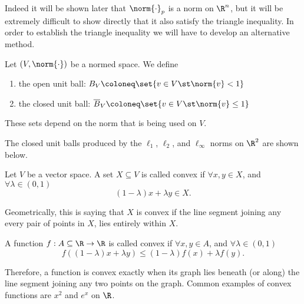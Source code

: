 \begin{remark}
  Indeed it will be shown later that $\norm{\cdot}_{p}$ is a norm on $\R^n$, but it will be extremely difficult to show directly that it also satisfy the triangle inequality. In order to establish the triangle inequality we will have to develop an alternative method.
\end{remark}

\begin{ndfn}
  Let $(V, \norm{\cdot})$ be a normed space. We define
  \begin{enumerate}
  \item the open unit ball: $\oB_{V} \coloneq \set{v \in V \st \norm{v} < 1}$
  \item the closed unit ball: $\cB_{V} \coloneq \set{v \in V \st \norm{v} \leq 1}$
  \end{enumerate}
\end{ndfn}
These sets depend on the norm that is being used on $V$.

The closed unit balls produced by the $\ell_{1}$, $\ell_{2}$, and $\ell_{\infty}$ norms on $\R^2$ are shown below.
\begin{center}
\end{center}

\begin{ndfn}
  Let $V$ be a vector space. A set $X \subseteq V$ is called convex if $\forall x,y \in X$, and $\forall \lambda \in (0,1)$
  \begin{equation*}
    (1-\lambda) x + \lambda y \in X.
  \end{equation*}
\end{ndfn}
Geometrically, this is saying that $X$ is convex if the line segment joining any every pair of points in $X$, lies entirely within $X$.

\begin{ndfn}
  A function $f : A \subseteq \R \to \R$ is called convex if $\forall x,y \in A$, and $\forall \lambda \in (0,1)$
  \begin{equation*}
    f\left((1-\lambda) x + \lambda y\right) \leq (1-\lambda) f(x) + \lambda f(y).
  \end{equation*}
\end{ndfn}
Therefore, a function is convex exactly when its graph lies beneath (or along) the line segment joining any two points on the graph. Common examples of convex functions are $x^2$ and $e^x$ on $\R$.

